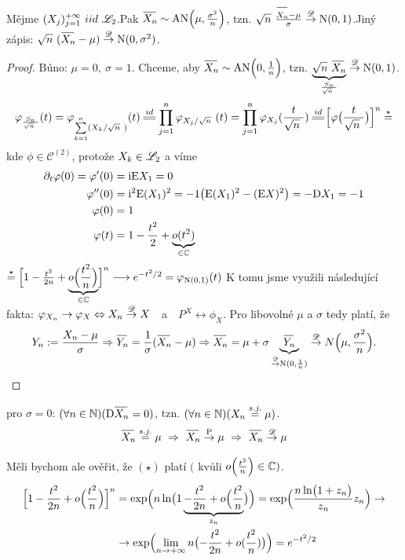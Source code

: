 \begin{theorem}
	Mějme $(X_j)_{j=1}^{+\infty}~iid~\mathscr{L}_2$.\newline Pak $\oxn \sim \mathrm{AN}\Bigl(\mu,\frac{\sigma^2}{n}\Bigr)$, tzn. $\sqrt{n}~\frac{\oxn -\mu}{\sigma}\Dto \mathrm{N}(0,1)$.\newline Jiný zápis: $ \sqrt{n}~(\oxn-\mu)\Dto \mathrm{N}(0,\sigma^2) $.
	\begin{proof}
		Búno: $\mu=0,~\sigma=1$. Chceme, aby $\oxn \sim \mathrm{AN}\Bigl(0,\frac{1}{n}\Bigr)$, tzn. $\underbrace{\sqrt{n}~\oxn }_{\frac{S_n}{\sqrt{n}~}}\Dto \mathrm{N}(0,1)$.
		$$ \phi_{\frac{S_n}{\sqrt{n}~}}(t)=\phi_{\suminftykn (X_k/\sqrt{n}~)}(t)\equal{id}\prod\limits_{j=1}^n \phi_{X_j/\sqrt{n}~}(t)=\prod\limits_{j=1}^n \phi_{X_j}(\frac{t}{\sqrt{n}~})\equal{id}\Bigl[ \phi\bigl( \frac{t}{\sqrt{n}~} \bigr) \Bigr]^n\stackrel{\star}{=} $$ kde $\phi\in \mathcal{C}^{(2)}$, protože $X_k\in\mathscr{L}_2$ a víme \[
			\begin{split}
			\partial_t\varphi(0)=\varphi'(0)&=\mathrm{i} \mathrm{E}  X_1=0 \\
			\varphi''(0)&= \mathrm{i}^2\mathrm{E} (X_1)^2=-1\bigl( \mathrm{E} (X_1)^2 - (\mathrm{E}  X)^2 \bigr)=-\mathrm{D} X_1=-1 \\
			\varphi(0)&=1 \\
			\varphi(t)&=1-\frac{t^2}{2}+\underbrace{o(t^2)}_{\in\mathbb{C}}
			\end{split}
			\]
			$ \stackrel{\star}{=} \Bigl[1-\frac{t^2}{2n}+\underbrace{o\Bigl(\frac{t^2}{n}\Bigr)}_{\in\mathbb{C}}\Bigr]^n\longrightarrow e^{-t^2/2}=\varphi_{\mathrm{N}(0,1)}(t)$\newline
			K tomu jsme využili následující fakta: $ \varphi_{X_n}\to \varphi_X \Leftrightarrow X_n \stackrel{\mathscr{D}}{\to} X $~~a~~$P^X\leftrightarrow \phi_X$.\newline
			Pro libovolné $\mu$ a $\sigma$ tedy platí, že $$Y_n:=\frac{X_n-\mu}{\sigma}\Rightarrow \oyn =\frac{1}{\sigma}(\oxn -\mu)\Rightarrow \oxn  = \mu+\sigma \underbrace{\oyn}_{\Dto \mathrm{N}(0,\frac{1}{n})}\Dto N\Bigl(\mu,\frac{\sigma^2}{n}\Bigr).$$
	\end{proof}
\end{theorem}
\begin{remark}
	pro $\sigma=0$: $(\forall n\in\N)(\D\oxn=0)$, tzn. $(\forall n\in\mathbb{N})(X_n\stackrel{s.j.}{=}\mu)$. 
	$$ \oxn\stackrel{s.j.}{=}\mu~\Rightarrow~\oxn\Pto\mu~\Rightarrow~\oxn\Dto \mu $$  
\end{remark}
\begin{remark}
	Měli bychom ale ověřit, že $(\star)$ platí $($ kvůli $o\Bigl(\frac{t^2}{n}\Bigr)\in\mathbb{C})$.
	\[
	\begin{split}
	\Bigl[1-\frac{t^2}{2n}+o\Bigl(\frac{t^2}{n}\Bigr)\Bigr]^n&=\exp\Bigl( n \ln \bigl(1\underbrace{-\frac{t^2}{2n}+o\Bigl(\frac{t^2}{n}}_{z_n}\bigr) \Bigr)=\exp\Bigl(\frac{ n \ln \bigl(1+z_n\bigr)}{z_n}z_n \Bigr)\to \\ &\to \exp\Bigl( \lim\limits_{ n\to +\infty} n\bigl( -\frac{t^2}{2n}+o(\frac{t^2}{n}) \bigr) \Bigr)=e^{-t^2/2} 
	\end{split}
	\] 
\end{remark}
